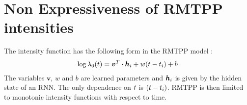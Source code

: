\section{Non Expressiveness of RMTPP intensities}
\label{non_expressiveness_hawkes_rmtpp}

The intensity function has the following form in the RMTPP model \cite{RMTPP}:
\begin{equation}
\begin{aligned}
\log \lambda_0(t) = \bm v^T\cdot \bm h_i + w(t-t_i) + b
\end{aligned}
\end{equation}
 The variables  $\bm v$, $w$ and $b$ are learned parameters and $\bm h_i$ is given by the hidden state of an RNN.  The only dependence on $t$ is $(t-t_i)$. RMTPP is then limited to monotonic intensity functions with respect to time.